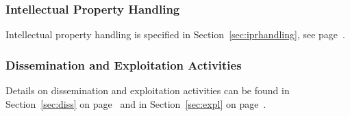 \subsubsection{Intellectual Property Handling}%

Intellectual property handling is specified in Section~\ref{sec:iprhandling}, see page~\pageref{sec:iprhandling}.

\subsubsection{Dissemination and Exploitation Activities}%

Details on dissemination and exploitation activities can be found in Section~\ref{sec:diss} on page~\pageref{sec:diss} and in Section~\ref{sec:expl} on page~\pageref{sec:expl}.

